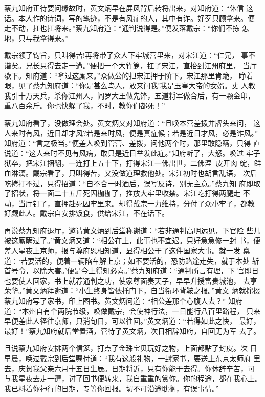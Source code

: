 蔡九知府正待要问缘故时，黄文炳早在屏风背后转将出来，对知府道：“休信
这话。本人作的诗词，写的笔迹，不是有风症的人，其中有诈。好歹只顾拿来。便
走不动，扛也扛将来。”蔡九知府道：“通判说得是。”便发落戴宗：“你们不拣
怎地，只与我拿得来。”

戴宗领了钧旨，只叫得苦!再将带了众人下牢城营里来，对宋江道：“仁兄，
事不谐矣。兄长只得去走一遭。”便把一个大竹箩，扛了宋江，直抬到江州府里，
当厅歇下。知府道：“拿过这厮来。”众做公的把宋江押于阶下。宋江那里肯跪，
睁着眼，见了蔡九知府道：“你是甚么鸟人，敢来问我!我是玉皇大帝的女婿。丈
人教我引十万天兵，杀你江州人，阎罗大王做先锋，五道将军做合后，有一颗金印，
重八百余斤。你也快躲了我，不时，教你们都死！”

蔡九知府看了，没做理会处。黄文炳又对知府道：“且唤本营差拨并牌头来问，
这人来时有风，近日却才风?若是来时风，便是真症候；若是近日才风，必是诈风。”
知府道：“言之极当。”便差人唤到管营、差拨，问他两个时，那里敢隐瞒，只得
直说道：“这人来时不见有风病，敢只是近日举发此症。”知府听了，大怒。唤过
牢子狱卒，把宋江捆翻，一连打上五十下，打得宋江一佛出世，二佛涅，皮开肉
绽，鲜血淋漓。戴宗看了，只叫得苦，又没做道理救他处。宋江初时也胡言乱语，
次后吃拷打不过，只得招道：“自不合一时酒后，误写反诗，别无主意。”蔡九知
府即取了招状，将一面二十五斤死囚枷枷了，推放大牢里收禁。宋江吃打得两腿走
不动，当厅钉了，直押赴死囚牢里来。却得戴宗一力维持，分付了众小牢子，都教
好觑此人。戴宗自安排饭食，供给宋江，不在话下。

再说蔡九知府退厅，邀请黄文炳到后堂称谢道：“若非通判高明远见，下官险
些儿被这厮瞒过了。”黄文炳又道：“相公在上，此事也不宜迟。只好急急修一封
书，便差人星夜上京师，报与尊府恩相知道，显得相公干了这件国家大事。就一发
禀道：‘若要活的，便着一辆陷车解上京；如不要活的，恐防路途走失，就于本处
斩首号令，以除大害。’便是今上得知必喜。”蔡九知府道：“通判所言有理，下
官即日也要使人回家，书上就荐通判之功，使家尊面奏天子，早早升授富贵城池，
去享荣华。”黄文炳拜谢道：“小生终身皆依托门下，自当衔环背鞍之报。”黄文
炳就撺掇蔡九知府写了家书，印上图书。黄文炳问道：“相公差那个心腹人去？”
知府道：“本州自有个两院节级，唤做戴宗，会使神行法，一日能行八百里路程，
只来早便差此人径往京师，只消旬日，可以往回。”黄文炳道：“若得如此之快，
最好，最好！”蔡九知府就后堂置酒，管待了黄文炳，次日相辞知府，自回无为军
去了。

且说蔡九知府安排两个信笼，打点了金珠宝贝玩好之物，上面都贴了封皮。次
日早晨，唤过戴宗到后堂嘱付道：“我有这般礼物，一封家书，要送上东京太师府
里去，庆贺我父亲六月十五日生辰。日期将近，只有你能干去得。你休辞辛苦，可
与我星夜去走一遭，讨了回书便转来，我自重重的赏你。你的程途，都在我心上。
我已料着你神行的日期，专等你回报。切不可沿途耽搁，有误事情。”

